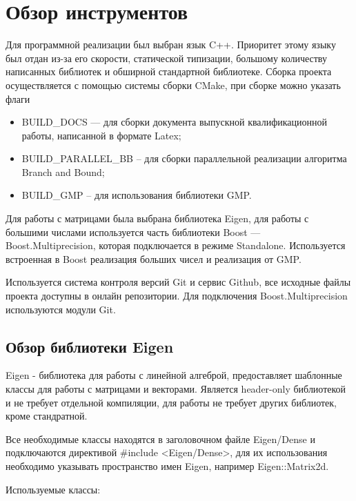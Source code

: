 \newpage

\section{Обзор инструментов}

Для программной реализации был выбран язык C++. Приоритет этому языку был отдан из-за его скорости, статической типизации, большому количеству написанных библиотек и обширной стандартной библиотеке. Сборка проекта осуществляется с помощью системы сборки CMake, при сборке можно указать флаги 
\begin{itemize}

\item BUILD\_DOCS --- для сборки документа выпускной квалификационной работы, написанной в формате Latex;

\item BUILD\_PARALLEL\_BB -- для сборки параллельной реализации алгоритма Branch and Bound;

\item BUILD\_GMP -- для использования библиотеки GMP.

\end{itemize} 

Для работы с матрицами была выбрана библиотека Eigen, для работы с большими числами используется часть библиотеки Boost --- Boost.Multiprecision, которая подключается в режиме Standalone. Используется встроенная в Boost реализация больших чисел и реализация от GMP.

Используется система контроля версий Git и сервис Github, все исходные файлы проекта доступны в онлайн репозитории. Для подключения Boost.Multiprecision используются модули Git.

\subsection{Обзор библиотеки Eigen}

Eigen - библиотека для работы с линейной алгеброй, предоставляет шаблонные классы для работы с матрицами и векторами. Является header-only библиотекой и не требует отдельной компиляции, для работы не требует других библиотек, кроме стандратной.

Все необходимые классы находятся в заголовочном файле Eigen/Dense и подключаются директивой \#include <Eigen/Dense>, для их использования необходимо указывать пространство имен Eigen, например Eigen::Matrix2d.

Используемые классы:

